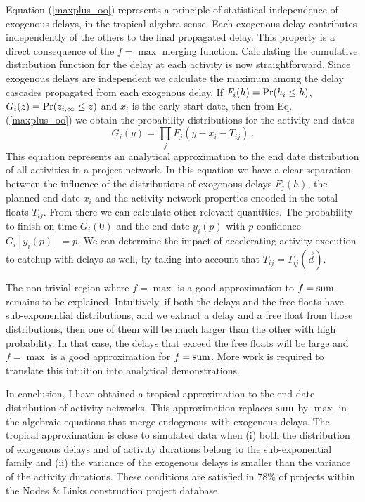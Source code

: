 \documentclass[reprint,aps,prl,amsmath,amssymb,superscriptaddress,showpacs]{revtex4-1}
\begin{document}
Equation (\ref{maxplus_oo}) represents a principle of statistical independence of exogenous delays, in the tropical algebra sense. Each exogenous delay contributes independently of the others to the final propagated delay. This property is a direct consequence of the $f=\max$ merging function. Calculating the cumulative distribution function for the delay at each activity is now straightforward. Since exogenous delays are independent we calculate the maximum among the delay cascades propagated from each exogenous delay.  If $F_i(h)={\rm Pr}(h_i\leq h)$, $G_i(z) = {\rm Pr}(z_{i,\infty}\leq z)$ and $x_i$ is the early start date, then from Eq. (\ref{maxplus_oo}) we obtain the probability distributions for the activity end dates
%
\begin{equation}
G_i(y) = \prod_{j} F_j(y-x_i-T_{ij})\ .
\label{CDF}
\end{equation}
%
This equation represents an analytical approximation to the end date distribution of all activities in a project network. In this equation we have a clear separation between the influence of the distributions of exogenous delays $F_j(h)$, the planned end date $x_i$ and the activity network properties encoded in the total floats $T_{ij}$. From there we can calculate other relevant quantities. The probability to finish on time $G_i(0)$ and the end date $y_i(p)$ with $p$ confidence $G_i[y_i(p)]=p$. We can determine the impact of accelerating activity execution to catchup with delays as well, by taking into account that $T_{ij}=T_{ij}(\vec{d})$.

The non-trivial region where $f=\max$ is a good approximation to $f={\rm sum}$ remains to be explained. Intuitively, if both the delays and the free floats have sub-exponential distributions, and we extract a delay and a free float from those distributions, then one of them will be much larger than the other with high probability. In that case, the delays that exceed the free floats will be large and $f=\max$ is a good approximation for $f={\rm sum}$. More work is required to translate this intuition into analytical demonstrations.

In conclusion, I have obtained a tropical approximation to the end date distribution of activity networks. This approximation replaces ${\rm sum}$ by $\max$ in the algebraic equations that merge endogenous with exogenous delays. The tropical approximation is close to simulated data when (i) both the distribution of exogenous delays and of activity durations belong to the sub-exponential family and (ii) the variance of the exogenous delays is smaller than the variance of the activity durations. These conditions are satisfied in 78\% of projects within the Nodes \& Links construction project database.
\end{document}
